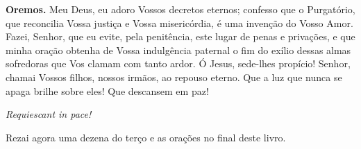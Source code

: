 \vspace{\baselineskip}\noindent \textbf{Oremos.} Meu Deus, eu adoro Vossos decretos eternos; confesso que o Purgatório, que reconcilia Vossa justiça e Vossa misericórdia, é uma invenção do Vosso Amor. Fazei, Senhor, que eu evite, pela penitência, este lugar de penas e privações, e que minha oração obtenha de Vossa indulgência paternal o fim do exílio dessas almas sofredoras que Vos clamam com tanto ardor. Ó Jesus, sede-lhes propício! Senhor, chamai Vossos filhos, nossos irmãos, ao repouso eterno. Que a luz que nunca se apaga brilhe sobre eles! Que descansem em paz!


\begin{center}
\textit{Requiescant in pace!}
\end{center}

Rezai agora uma dezena do terço e as orações no final deste livro.
